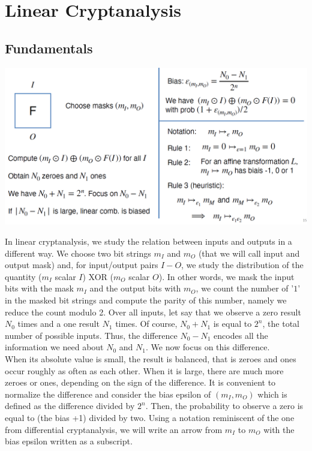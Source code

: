 \section{Linear Cryptanalysis}
	\subsection{Fundamentals}
		\begin{center}
			\includegraphics[width=140mm]{Graphics/Cryptanalysis/c6.png}
		\end{center}
		In linear cryptanalysis, we study the relation between inputs and outputs in a different way. 
		We choose two bit strings $m_I$ and $m_O$ (that we will call input and output mask) and, for input/output pairs $I-O$, 
		we study the distribution of the quantity ($m_I$ scalar $I$) XOR ($m_O$ scalar $O$). 
		In other words, we mask the input bits with the mask $m_I$ and the output bits with $m_O$, we count the number of '$1$' in the masked bit strings and compute the parity of this number, 
		namely we reduce the count modulo 2. 
		Over all inputs, let say that we observe a zero result $N_0$ times and a one result $N_1$ times. 
		Of course, $N_0 + N_1$ is equal to $2^n$, the total number of possible inputs. 
		Thus, the difference $N_0 - N_1$ encodes all the information we need about $N_0$ and $N_1$. 
		We now focus on this difference.\\
		When its absolute value is small, the result is balanced, that is zeroes and ones occur roughly as often as each other. 
		When it is large, there are much more zeroes or ones, depending on the sign of the difference.
		It is convenient to normalize the difference and consider the bias epsilon of $(m_I, m_O)$ which is defined as the difference divided by $2^n$. 
		Then, the probability to observe a zero is equal to (the bias +1) divided by two.
		Using a notation reminiscent of the one from differential cryptanalysis, we will write an arrow from $m_I$ to $m_O$ with the bias epsilon written as a subscript. 
